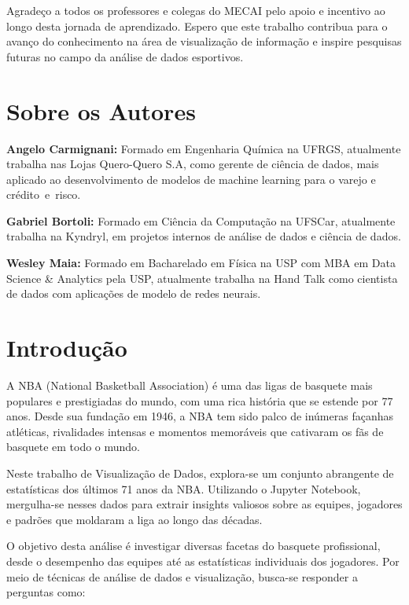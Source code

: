 \documentclass[
]{book}
\begin{document}
Agradeço a todos os professores e colegas do MECAI pelo apoio e incentivo ao longo desta jornada de aprendizado. Espero que este trabalho contribua para o avanço do conhecimento na área de visualização de informação e inspire pesquisas futuras no campo da análise de dados esportivos.

\hypertarget{author}{%
\chapter*{Sobre os Autores}\label{author}}

\textbf{Angelo Carmignani:} Formado em Engenharia Química na UFRGS, atualmente trabalha nas Lojas Quero-Quero S.A, como gerente de ciência de dados, mais aplicado ao desenvolvimento de modelos de machine learning para o varejo e crédito~e~risco.

\textbf{Gabriel Bortoli:} Formado em Ciência da Computação na UFSCar, atualmente trabalha na Kyndryl, em projetos internos de análise de dados e ciência de dados.

\textbf{Wesley Maia:} Formado em Bacharelado em Física na USP com MBA em Data Science \& Analytics pela USP, atualmente trabalha na Hand Talk como cientista de dados com aplicações de modelo de redes neurais.

\hypertarget{introduuxe7uxe3o}{%
\chapter{Introdução}\label{introduuxe7uxe3o}}

A NBA (National Basketball Association) é uma das ligas de basquete mais populares e prestigiadas do mundo, com uma rica história que se estende por 77 anos. Desde sua fundação em 1946, a NBA tem sido palco de inúmeras façanhas atléticas, rivalidades intensas e momentos memoráveis que cativaram os fãs de basquete em todo o mundo.

Neste trabalho de Visualização de Dados, explora-se um conjunto abrangente de estatísticas dos últimos 71 anos da NBA. Utilizando o Jupyter Notebook, mergulha-se nesses dados para extrair insights valiosos sobre as equipes, jogadores e padrões que moldaram a liga ao longo das décadas.

O objetivo desta análise é investigar diversas facetas do basquete profissional, desde o desempenho das equipes até as estatísticas individuais dos jogadores. Por meio de técnicas de análise de dados e visualização, busca-se responder a perguntas como:
\end{document}
